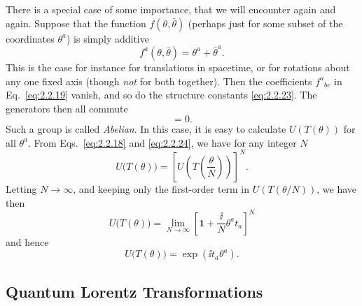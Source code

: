 There is a special case of some importance, that we will encounter again
and again. Suppose that the function $f(\theta,\bar\theta)$ (perhaps just
for some subset of the coordinates $\theta^a$) is simply additive
\begin{equation}
  f^a(\theta,\bar\theta)=\theta^a+\bar\theta^a.
  \tag{2.2.24}\label{eq:2.2.24}
\end{equation}
This is the case for instance for translations in spacetime, or for
rotations about any one fixed axis (though \emph{not} for both together).
Then the coefficients $f^a{}_{bc}$ in Eq.~\eqref{eq:2.2.19} vanish, and so do the
structure constants \eqref{eq:2.2.23}. The generators then all commute
\begin{equation}
  [t_b,t_c]=0.
  \tag{2.2.25}\label{eq:2.2.25}
\end{equation}
Such a group is called \emph{Abelian}. In this case, it is easy to
calculate $U(T(\theta))$ for all $\theta^a$. From Eqs.~\eqref{eq:2.2.18} and
\eqref{eq:2.2.24}, we have for any integer $N$
\begin{equation*}
  U\bigl(T(\theta)\bigr)
    =\left[U\left(T\left(\frac{\theta}{N}\right)\right)\right]^N.
\end{equation*}
Letting $N\to\infty$, and keeping only the first-order term in
$U(T(\theta/N))$, we have then
\begin{equation*}
  U\bigl(T(\theta)\bigr)
    =\lim_{N\to\infty}
      \left[\mathbf{1}+\frac{\ii}{N}\theta^a t_a\right]^N
\end{equation*}
and hence
\begin{equation}
  U\bigl(T(\theta)\bigr)=\exp(\ii t_a\theta^a).
  \tag{2.2.26}\label{eq:2.2.26}
\end{equation}

\subsection{Quantum Lorentz Transformations}

